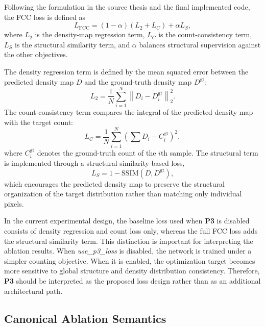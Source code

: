 \documentclass[a4paper,fleqn]{cas-sc}
\begin{document}
Following the formulation in the source thesis and the final implemented code, the FCC loss is defined as
\begin{equation}
    L_{\mathrm{FCC}} = (1 - \alpha)\left(L_2 + L_C\right) + \alpha L_S,
\end{equation}
where $L_2$ is the density-map regression term, $L_C$ is the count-consistency term, $L_S$ is the structural similarity term, and $\alpha$ balances structural supervision against the other objectives.

The density regression term is defined by the mean squared error between the predicted density map $D$ and the ground-truth density map $D^{\mathrm{gt}}$:
\begin{equation}
    L_2 = \frac{1}{N}\sum_{i=1}^{N}\left\| D_i - D_i^{\mathrm{gt}} \right\|_2^2.
\end{equation}
The count-consistency term compares the integral of the predicted density map with the target count:
\begin{equation}
    L_C = \frac{1}{N}\sum_{i=1}^{N} \left( \sum D_i - C_i^{\mathrm{gt}} \right)^2,
\end{equation}
where $C_i^{\mathrm{gt}}$ denotes the ground-truth count of the $i$th sample. The structural term is implemented through a structural-similarity-based loss,
\begin{equation}
    L_S = 1 - \mathrm{SSIM}(D, D^{\mathrm{gt}}),
\end{equation}
which encourages the predicted density map to preserve the structural organization of the target distribution rather than matching only individual pixels.

In the current experimental design, the baseline loss used when \textbf{P3} is disabled consists of density regression and count loss only, whereas the full FCC loss adds the structural similarity term. This distinction is important for interpreting the ablation results. When \textit{use\_p3\_loss} is disabled, the network is trained under a simpler counting objective. When it is enabled, the optimization target becomes more sensitive to global structure and density distribution consistency. Therefore, \textbf{P3} should be interpreted as the proposed loss design rather than as an additional architectural path.

\subsection{Canonical Ablation Semantics}
\end{document}
